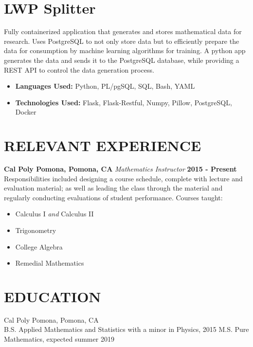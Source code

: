\documentclass[margin]{../res}
\begin{document}
\begin{resume}
\normalsize{\section{LWP Splitter}}
Fully containerized application that generates and stores mathematical data for
research.
Uses PostgreSQL to not only store data but to efficiently prepare the data for
consumption by machine learning algorithms for training.
A python app generates the data and sends it to the PostgreSQL
database, while providing a REST API to control the data generation process.
\begin{itemize}
\item{ \bf Languages Used: } Python, PL/pgSQL, SQL, Bash, YAML
\item { \bf Technologies Used: } Flask, Flask-Restful, Numpy, Pillow, PostgreSQL, Docker
\end{itemize}

\section{RELEVANT EXPERIENCE}
{\bf Cal Poly Pomona, Pomona, CA}\newline
{\it Mathematics Instructor}\newline
{\bf 2015 - Present}\newline
Responsibilities included designing a course schedule, complete with lecture and
evaluation material; as well as leading the class through the material and
regularly conducting evaluations of student performance.\newline
Courses taught:
\begin{multicols}{2}
\begin{itemize}
\item Calculus I {\it and} Calculus II
\item Trigonometry
  \columnbreak
\item College Algebra
\item Remedial Mathematics
\end{itemize}
\end{multicols}

\section{EDUCATION}
Cal Poly Pomona, Pomona, CA \\
B.S. Applied Mathematics and Statistics with a minor in Physics, 2015 \newline
M.S. Pure Mathematics, expected summer 2019


\end{resume}
\end{document}
